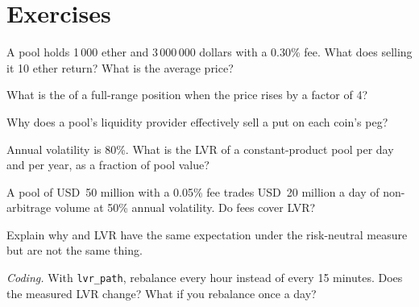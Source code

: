 \section{Exercises}

\begin{exercise}[$\star$]\label{exo:m3:automated-market-makers:1}
A pool holds 1\,000 ether and 3\,000\,000 dollars with a 0.30\% fee. What does selling it 10 ether return? What is the average price?
\end{exercise}

\begin{exercise}[$\star$]\label{exo:m3:automated-market-makers:2}
What is the  of a full-range position when the price rises by a factor of 4?
\end{exercise}

\begin{exercise}[$\star$]\label{exo:m3:automated-market-makers:3}
Why does a  pool's liquidity provider effectively sell a put on each coin's peg?
\end{exercise}

\begin{exercise}[$\star\star$]\label{exo:m3:automated-market-makers:4}
Annual volatility is 80\%. What is the LVR of a constant-product pool per day and per year, as a fraction of pool value?
\end{exercise}

\begin{exercise}[$\star\star$]\label{exo:m3:automated-market-makers:5}
A pool of USD~50 million with a 0.05\% fee trades USD~20 million a day of non-arbitrage volume at 50\% annual volatility. Do fees cover LVR?
\end{exercise}

\begin{exercise}[$\star\star$]\label{exo:m3:automated-market-makers:6}
Explain why  and LVR have the same expectation under the risk-neutral measure but are not the same thing.
\end{exercise}

\begin{exercise}[$\star\star\star$]\label{exo:m3:automated-market-makers:7}
\emph{Coding.} With \texttt{lvr\_path}, rebalance every hour instead of every 15 minutes. Does the measured LVR change? What if you rebalance once a day?
\end{exercise}

